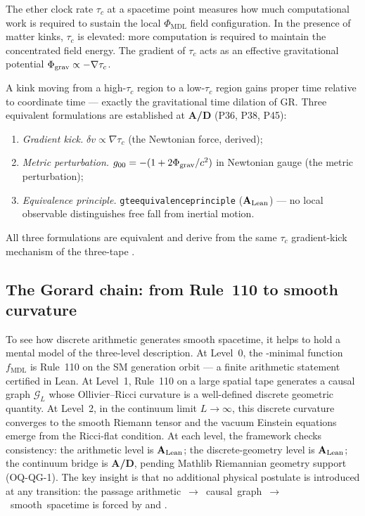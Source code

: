 \documentclass[11pt,openany]{book}
\theoremstyle{remark}
\newcommand{\MDL}{\text{MDL}}
\newcommand{\PSC}{\text{PSC}}
\newcommand{\PHIMDL}{\Phi_{\mathrm{MDL}}}
\newcommand{\lean}[1]{%
  \penalty-100
  \begingroup\def\_{\textunderscore\allowbreak}\texttt{#1}\endgroup}
\newcommand{\CMCA}{\text{CMCA}}
\newcommand{\CatAL}{\ensuremath{\textbf{A}_{\rm Lean}}}
\newcommand{\CatAD}{\textbf{A/D}}
\begin{document}
The ether clock rate $\tau_c$ at a spacetime point measures how much computational
work is required to sustain the local $\PHIMDL$ field configuration.
In the presence of matter kinks, $\tau_c$ is elevated: more computation is required
to maintain the concentrated field energy.
The gradient of $\tau_c$ acts as an effective gravitational potential
$\Phi_{\rm grav} \propto -\nabla\tau_c$.

A kink moving from a high-$\tau_c$ region to a low-$\tau_c$ region gains proper
time relative to coordinate time --- exactly the gravitational time dilation of GR.
Three equivalent formulations are established at \CatAD{} (P36, P38, P45):
\begin{enumerate}
\item \textit{Gradient kick.}
  $\delta v \propto \nabla\tau_c$ (the Newtonian force, derived);
\item \textit{Metric perturbation.}
  $g_{00} = -(1 + 2\Phi_{\rm grav}/c^2)$ in Newtonian gauge (the metric perturbation);
\item \textit{Equivalence principle.}
  \lean{gte\_equivalence\_principle} (\CatAL) --- no local observable distinguishes
  free fall from inertial motion.
\end{enumerate}
All three formulations are equivalent and derive from the same $\tau_c$ gradient-kick
mechanism of the three-tape \CMCA{}.

\subsection*{The Gorard chain: from Rule~110 to smooth curvature}

To see how discrete arithmetic generates smooth spacetime, it helps to hold a mental
model of the three-level description.  At Level~0, the \MDL-minimal function $f_{\MDL}$
is Rule~110 on the SM generation orbit --- a finite arithmetic statement certified in
Lean.  At Level~1, Rule~110 on a large spatial tape generates a causal graph
$\mathcal{G}_L$ whose Ollivier--Ricci curvature is a well-defined discrete geometric
quantity.  At Level~2, in the continuum limit $L\to\infty$, this discrete curvature
converges to the smooth Riemann tensor and the vacuum Einstein equations emerge from the
Ricci-flat condition.  At each level, the framework checks consistency: the arithmetic
level is \CatAL; the discrete-geometry level is \CatAL; the continuum bridge is \CatAD,
pending Mathlib Riemannian geometry support (OQ-QG-1).  The key insight is that no
additional physical postulate is introduced at any transition: the passage
\mbox{arithmetic $\to$ causal graph $\to$ smooth spacetime} is forced by \MDL{}
and \PSC.
\end{document}
